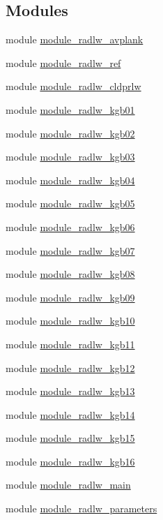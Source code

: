 \subsection*{Modules}
\begin{DoxyCompactItemize}
\item 
module \hyperlink{namespacemodule__radlw__avplank}{module\+\_\+radlw\+\_\+avplank}
\item 
module \hyperlink{namespacemodule__radlw__ref}{module\+\_\+radlw\+\_\+ref}
\item 
module \hyperlink{namespacemodule__radlw__cldprlw}{module\+\_\+radlw\+\_\+cldprlw}
\item 
module \hyperlink{namespacemodule__radlw__kgb01}{module\+\_\+radlw\+\_\+kgb01}
\item 
module \hyperlink{namespacemodule__radlw__kgb02}{module\+\_\+radlw\+\_\+kgb02}
\item 
module \hyperlink{namespacemodule__radlw__kgb03}{module\+\_\+radlw\+\_\+kgb03}
\item 
module \hyperlink{namespacemodule__radlw__kgb04}{module\+\_\+radlw\+\_\+kgb04}
\item 
module \hyperlink{namespacemodule__radlw__kgb05}{module\+\_\+radlw\+\_\+kgb05}
\item 
module \hyperlink{namespacemodule__radlw__kgb06}{module\+\_\+radlw\+\_\+kgb06}
\item 
module \hyperlink{namespacemodule__radlw__kgb07}{module\+\_\+radlw\+\_\+kgb07}
\item 
module \hyperlink{namespacemodule__radlw__kgb08}{module\+\_\+radlw\+\_\+kgb08}
\item 
module \hyperlink{namespacemodule__radlw__kgb09}{module\+\_\+radlw\+\_\+kgb09}
\item 
module \hyperlink{namespacemodule__radlw__kgb10}{module\+\_\+radlw\+\_\+kgb10}
\item 
module \hyperlink{namespacemodule__radlw__kgb11}{module\+\_\+radlw\+\_\+kgb11}
\item 
module \hyperlink{namespacemodule__radlw__kgb12}{module\+\_\+radlw\+\_\+kgb12}
\item 
module \hyperlink{namespacemodule__radlw__kgb13}{module\+\_\+radlw\+\_\+kgb13}
\item 
module \hyperlink{namespacemodule__radlw__kgb14}{module\+\_\+radlw\+\_\+kgb14}
\item 
module \hyperlink{namespacemodule__radlw__kgb15}{module\+\_\+radlw\+\_\+kgb15}
\item 
module \hyperlink{namespacemodule__radlw__kgb16}{module\+\_\+radlw\+\_\+kgb16}
\item 
module \hyperlink{namespacemodule__radlw__main}{module\+\_\+radlw\+\_\+main}
\item 
module \hyperlink{namespacemodule__radlw__parameters}{module\+\_\+radlw\+\_\+parameters}
\end{DoxyCompactItemize}

